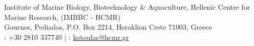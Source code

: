 \documentclass[
    a4paper,
]{../fortysecondscv}
\begin{document}
\begin{cvtable}

        



            {
                Institute of Marine Biology, Biotechnology \& Aquaculture, Hellenic Centre for Marine Research, (IMBBC - HCMR) \\
                Gournes, Pediados, P.O. Box 2214, Heraklion Crete 71003, Greece \\ 
                \faPhone: +30 2810 337740 | 
                \faAt: \href{mailto:kotoulas@hcmr.gr}{kotoulas@hcmr.gr}
            } 




    \end{cvtable}


\makebacksidebar
\end{document}
